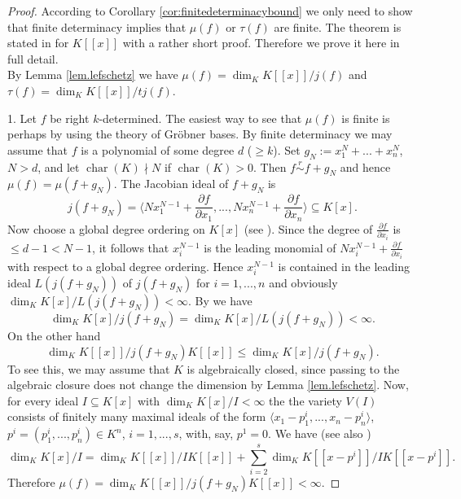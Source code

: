 \documentclass[11pt]{article}
\DeclareMathOperator{\Char}{char}
\begin{document}
\begin{proof} According to Corollary \ref{cor:finitedeterminacybound} we only need to show that finite determinacy implies that $\mu(f)$ or $\tau(f)$ are finite. The theorem is stated in  \cite[Theorem 4.8]{GPh2} for $K[[x]]$ with a rather short proof. Therefore we prove it here in full detail.\\
By Lemma \ref{lem.lefschetz} we have $\mu(f) = \dim_K K[[x]]/j(f)$ and $\tau(f) = \dim_K K[[x]]/tj(f)$.

1. Let $f$ be right $k$-determined. The easiest way to see that $\mu(f)$ is finite is perhaps by using the theory of Gr\"obner bases.
By finite determinacy we may assume that $f$ is a polynomial of some degree $d$ ($\ge k$).
Set $g_N := x_1^N+...+x_n^N$, $N > d$, and let $ \Char (K) \nmid N$ if $\Char (K) >0$. Then $f\overset{r}{\sim} f+g_N$ and hence $\mu(f) = \mu(f +g_N)$. The Jacobian ideal of $f +g_N$ is
$$j(f +g_N) = \langle N x_1^{N-1}+\frac {\partial f}{\partial x_1},...,N x_n^{N-1}+\frac {\partial f}{\partial x_n}\rangle \subseteq K[x].$$
Now choose a global degree ordering on $K[x]$ (see \cite{GG}). Since the degree of $\frac {\partial f}{\partial x_i}$
is $\le d-1 < N-1$, it follows that $x_i^{N-1}$ is the leading monomial of 
$N x_i^{N-1}+\frac {\partial f}{\partial x_i}$
with respect to a global degree ordering. Hence $x_i^{N-1}$ is  contained in the leading ideal $L(j(f +g_N))$ of $j(f +g_N)$ for $i=1,...,n$ and obviously $\dim_K K[x]/L(j(f +g_N))<\infty$.
By \cite[Corollary 7.5.6]{GG} we have 
$$\dim_K K[x]/j(f +g_N) = \dim_K K[x]/L(j(f +g_N))< \infty.$$
On the other hand 
$$\dim_K K[[x]]/j(f +g_N)K[[x]] \le \dim_K K[x]/j(f +g_N).$$
To see this, we may assume that $K$ is algebraically closed, since passing to the algebraic closure does not change the dimension by Lemma \ref{lem.lefschetz}. Now, for every ideal $I\subseteq K[x]$ with $\dim_KK[x]/I < \infty$
the the variety $V(I)$ consists of finitely many maximal ideals of the form $\langle x_1 -p^i_1,...,x_n-p^i_n\rangle$,
$p^i=(p^i_1,...,p^i_n) \in K^n$, $i=1,...,s$, with, say, $p^1 = 0$. We have (see also \cite[Appendix A.9]{GG})
 {$$ \dim_K K[x]/I = \dim_K K[[x]]/IK[[x]] +\sum^s_{i=2} \dim_K K[[x-p^i]]/IK[[x-p^i]].$$}
Therefore 
$\mu(f) = \dim_K K[[x]]/j(f +g_N)K[[x]] < \infty$.


\end{proof}
\end{document}

